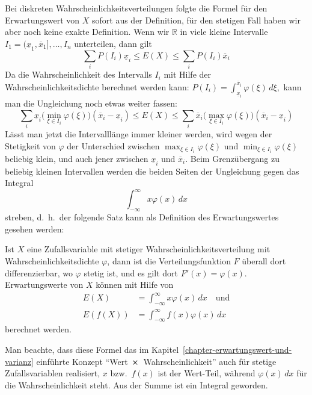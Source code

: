 Bei diskreten Wahrscheinlichkeitsverteilungen folgte die Formel für den
Erwartungswert von $X$ sofort aus der Definition, für den stetigen
Fall haben wir aber noch keine exakte Definition.
Wenn wir $\mathbb{R}$
in viele kleine Intervalle $I_1=(\underline x_1,\overline x_1],\dots, I_n$
unterteilen, dann gilt
\[
\sum_{i}P(I_i)\underline x_i\le
E(X)
\le
\sum_{i}P(I_i)\overline x_i
\]
Da die Wahrscheinlichkeit des Intervalls $I_i$ mit Hilfe der
Wahrscheinlichkeitsdichte berechnet werden kann:
$P(I_i)=\int_{\underline x_i}^{\overline x_i}\varphi(\xi)\,d\xi,$
kann man die Ungleichung noch etwas weiter fassen:
\[
\sum_{i}\underline x_i\bigl(\min_{\xi\in I_i}\varphi(\xi)\bigr)(\overline x_i-\underline x_i)\le
E(X)
\le
\sum_{i}\overline x_i\bigl(\max_{\xi\in I_i}\varphi(\xi)\bigr)(\overline x_i-\underline x_i)
\]
Lässt man jetzt die Intervalllänge immer kleiner werden, wird wegen der
Stetigkeit von $\varphi$ der Unterschied zwischen
$\max_{\xi\in I_i}\varphi(\xi)$ und
$\min_{\xi\in I_i}\varphi(\xi)$ beliebig klein, und auch jener
zwischen $\underline x_i$ und $\overline x_i$.
Beim Grenzübergang
zu beliebig kleinen Intervallen werden die beiden Seiten der Ungleichung
gegen das Integral
\[
\int_{-\infty}^{\infty}x\varphi(x)\,dx
\]
streben, d.~h.~der folgende Satz kann als Definition des Erwartungswertes
gesehen werden:
\begin{satz}
Ist $X$ eine Zufallsvariable mit stetiger
Wahrscheinlichkeitsverteilung mit Wahrscheinlichkeitsdichte
$\varphi$, dann
ist die Verteilungsfunktion $F$ überall dort differenzierbar, wo
$\varphi$ stetig ist, und es gilt dort
$F'(x)=\varphi(x)$.
Erwartungswerte von $X$ können mit Hilfe von
\begin{align*}
E(X)&=\int_{-\infty}^{\infty}x\varphi(x)\,dx\quad\text{und}\\
E(f(X))&=\int_{-\infty}^{\infty}f(x)\varphi(x)\,dx
\end{align*}
berechnet werden.
\end{satz}

Man beachte, dass diese Formel das im
Kapitel~\ref{chapter-erwartungswert-und-varianz} einführte Konzept
``Wert $\mathstrut \times\mathstrut $ Wahrscheinlichkeit''
auch für stetige Zufallsvariablen realisiert, $x$ bzw.~$f(x)$ ist
der Wert-Teil, während $\varphi(x)\,dx$ für die Wahrscheinlichkeit
steht.
Aus der Summe ist ein Integral geworden.

